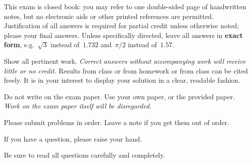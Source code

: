 This exam is closed book: you may refer to one double-sided page of handwritten notes, but no electronic aids or other
printed references are permitted. Justification of all answers is required
for partial credit unless otherwise noted; please  your final answers. Unless specifically directed, leave all answers in \textbf{exact form}, e.g.\ $\sqrt{3}$ instead of~$1.732$ and~$\pi/2$ instead of~$1.57$.

Show all pertinent work. \emph{Correct answers without accompanying work will receive little or no credit.} Results from class or from homework or from class can be cited freely. It is in your interest to display your solution in a
clear, readable fashion.

Do not write on the exam paper. Use your own paper, or the provided paper. \emph{Work on the exam paper itself will be disregarded.} 

Please submit problems in order. Leave a note if you get them out of order.

If you have a question, please raise your hand.

Be sure to read all questions carefully and completely.